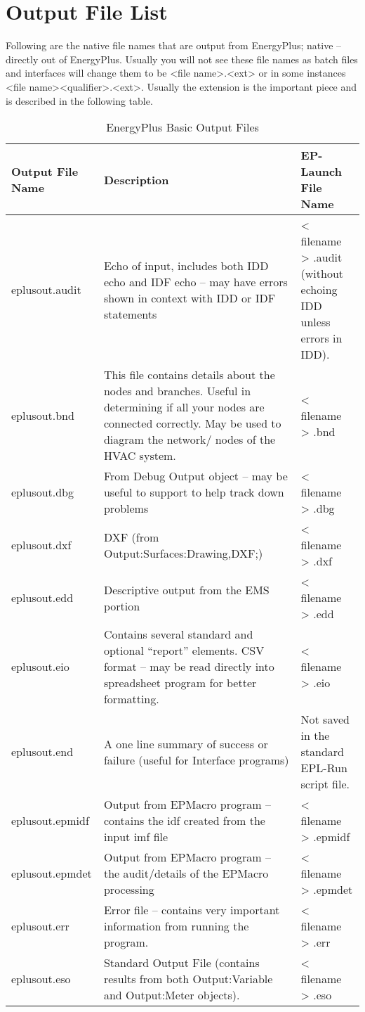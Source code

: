 \section{Output File List}\label{output-file-list}

Following are the native file names that are output from EnergyPlus; native -- directly out of EnergyPlus. Usually you will not see these file names as batch files and interfaces will change them to be \textless{}file name\textgreater{}.\textless{}ext\textgreater{} or in some instances \textless{}file name\textgreater{}\textless{}qualifier\textgreater{}.\textless{}ext\textgreater{}. Usually the extension is the important piece and is described in the following table.

\begin{longtable}[c]{p{1.5in}p{3.0in}p{1.5in}}
\caption{EnergyPlus Basic Output  Files \protect \label{table:energyplus-basic-output-files}}\\
\toprule 
Output File Name & Description & EP-Launch File Name \tabularnewline \midrule
\endhead
eplusout.audit & Echo of input, includes both IDD echo and IDF echo – may have errors shown in context with IDD or IDF statements & < filename > .audit (without echoing IDD unless errors in IDD). \tabularnewline
eplusout.bnd & This file contains details about the nodes and branches. Useful in determining if all your nodes are connected correctly. May be used to diagram the network/ nodes of the HVAC system. & < filename > .bnd \tabularnewline
eplusout.dbg & From Debug Output object – may be useful to support to help track down problems & < filename > .dbg \tabularnewline
eplusout.dxf & DXF (from Output:Surfaces:Drawing,DXF;) & < filename > .dxf \tabularnewline
eplusout.edd & Descriptive output from the EMS portion & < filename > .edd \tabularnewline
eplusout.eio & Contains several standard and optional “report” elements. CSV format – may be read directly into spreadsheet program for better formatting. & < filename > .eio \tabularnewline
eplusout.end & A one line summary of success or failure (useful for Interface programs) & Not saved in the standard EPL-Run script file. \tabularnewline
eplusout.epmidf & Output from EPMacro program – contains the idf created from the input imf file & < filename > .epmidf \tabularnewline
eplusout.epmdet & Output from EPMacro program – the audit/details of the EPMacro processing & < filename > .epmdet \tabularnewline
eplusout.err & Error file – contains very important information from running the program. & < filename > .err \tabularnewline
eplusout.eso & Standard Output File (contains results from both Output:Variable and Output:Meter objects). & < filename > .eso \tabularnewline

\end{longtable}
